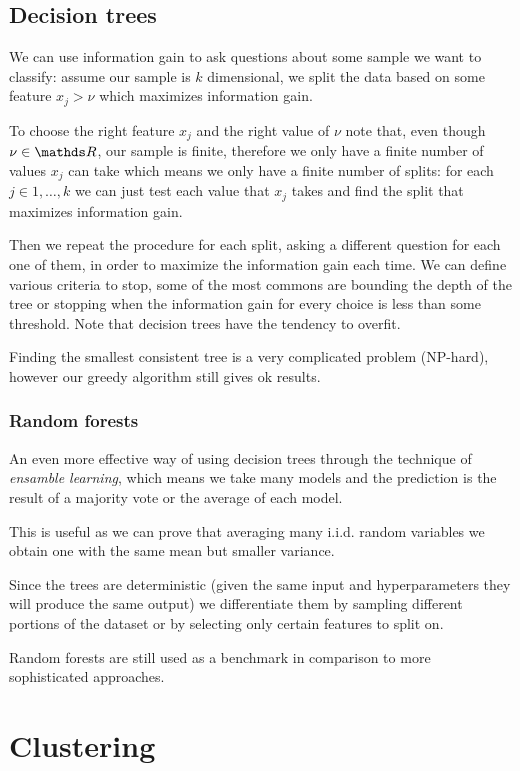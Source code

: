 \documentclass[12pt]{extarticle}
\begin{document}
\subsection{Decision trees}

We can use information gain to ask questions about some sample we want to classify:
assume our sample is $k$ dimensional, we split the data based on some feature $x_j > \nu$ which
maximizes information gain.

To choose the right feature $x_j$ and the right value of $\nu$ note that, even though $\nu \in \R$,
our sample is finite, therefore we only have a finite number of values $x_j$ can take which means
we only have a finite number of splits: for each $j \in 1, \dots, k$ we can just test each value
that $x_j$ takes and find the split that maximizes information gain.

Then we repeat the procedure for each split, asking a different question for each one of them, in
order to maximize the information gain each time.
We can define various criteria to stop, some of the most commons are bounding the depth of the
tree or stopping when the information gain for every choice is less than some threshold.
Note that decision trees have the tendency to overfit.

Finding the smallest consistent tree is a very complicated problem (NP-hard), however our greedy
algorithm still gives ok results.

\subsubsection{Random forests}

An even more effective way of using decision trees through the technique of
\emph{ensamble learning}, which means we take many models and the prediction is the result of a
majority vote or the average of each model.

This is useful as we can prove that averaging many i.i.d. random variables we obtain one with the
same mean but smaller variance.

Since the trees are deterministic (given the same input and hyperparameters they will produce the
same output) we differentiate them by sampling different portions of the dataset or by selecting
only certain features to split on.

Random forests are still used as a benchmark in comparison to more sophisticated approaches.

\section{Clustering}
\end{document}
